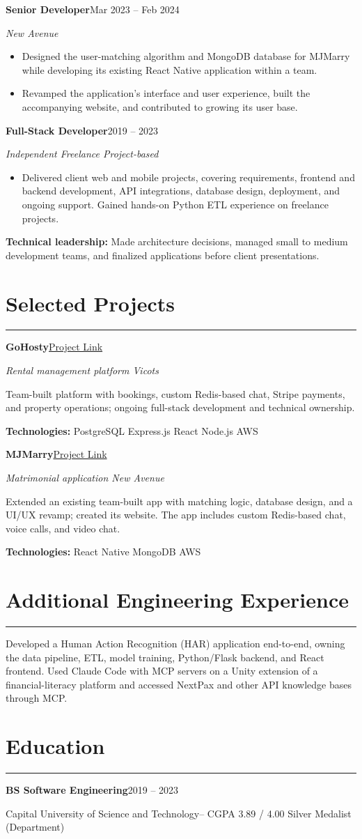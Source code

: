 \documentclass[10pt,a4paper]{article}
\newcommand{\atssection}[1]{\section*{#1}\vspace{0.5mm}\hrule\vspace{1mm}}
\newcommand{\cveducation}[4]{\textbf{#2}\hfill #1\par #3\if\relax\detokenize{#4}\relax\else\space -- #4\fi\par\vspace{0.6mm plus 0.18fill}}
\newcommand{\cventry}[4]{\textbf{#2}\hfill #1\par\textit{#3}\par #4\par\vspace{1mm plus 0.32fill}}
\newcommand{\cvproject}[5]{\textbf{#1}\hfill\href{#5}{Project Link}\par\textit{#2}\par #3\par\textbf{Technologies:} #4\par\vspace{1mm plus 0.32fill}}
\begin{document}
\cventry{Mar 2023 -- Feb 2024}{Senior Developer}{New Avenue}{%
\begin{itemize}
\item Designed the user-matching algorithm and MongoDB database for MJMarry while developing its existing React Native application within a team.
\item Revamped the application's interface and user experience, built the accompanying website, and contributed to growing its user base.
\end{itemize}}
\cventry{2019 -- 2023}{Full-Stack Developer}{Independent Freelance \textbar{} Project-based}{%
\begin{itemize}
\item Delivered client web and mobile projects, covering requirements, frontend and backend development, API integrations, database design, deployment, and ongoing support. Gained hands-on Python ETL experience on freelance projects.
\end{itemize}}
\textbf{Technical leadership:} Made architecture decisions, managed small to medium development teams, and finalized applications before client presentations.\par\vspace{1mm}
\atssection{Selected Projects}
\cvproject{GoHosty}{Rental management platform \textbar{} Vicots}{Team-built platform with bookings, custom Redis-based chat, Stripe payments, and property operations; ongoing full-stack development and technical ownership.}{PostgreSQL \textperiodcentered{} Express.js \textperiodcentered{} React \textperiodcentered{} Node.js \textperiodcentered{} AWS}{https://gohosty.com/}
\cvproject{MJMarry}{Matrimonial application \textbar{} New Avenue}{Extended an existing team-built app with matching logic, database design, and a UI/UX revamp; created its website. The app includes custom Redis-based chat, voice calls, and video chat.}{React Native \textperiodcentered{} MongoDB \textperiodcentered{} AWS}{https://play.google.com/store/apps/details?id=com.iahtasham.mjmarry}
\atssection{Additional Engineering Experience}
Developed a Human Action Recognition (HAR) application end-to-end, owning the data pipeline, ETL, model training, Python/Flask backend, and React frontend. Used Claude Code with MCP servers on a Unity extension of a financial-literacy platform and accessed NextPax and other API knowledge bases through MCP.\par
\atssection{Education}
\cveducation{2019 -- 2023}{BS Software Engineering}{Capital University of Science and Technology}{CGPA 3.89 / 4.00 \textperiodcentered{} Silver Medalist (Department)}
\end{document}
